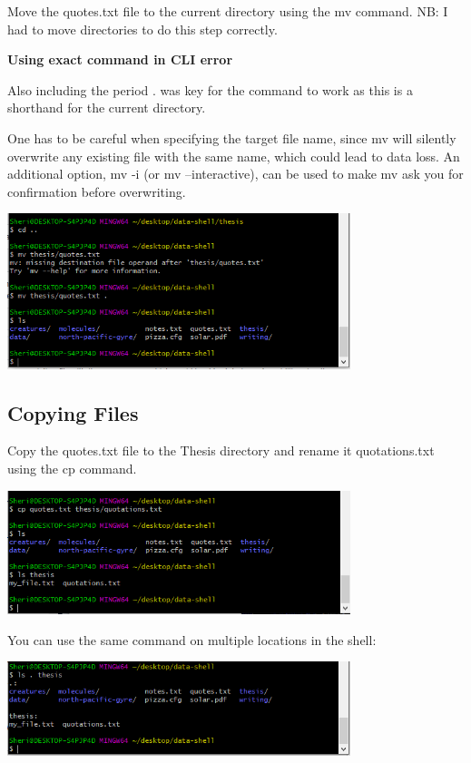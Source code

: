 \documentclass{article}
\begin{document}
Move the quotes.txt file to the current directory using the mv command.
NB: I had to move directories to do this step correctly.

\textbf{Using exact command in CLI error}
\label{ Error: Using exact commands in CLI}

Also including the period . was key for the command to work as this is a shorthand for the current directory.

One has to be careful when specifying the target file name, since mv will silently overwrite any existing file with the same name, which could lead to data loss. An additional option, mv -i (or mv --interactive), can be used to make mv ask you for confirmation before overwriting.

\includegraphics[width=10cm]{Images/GitBash_017.PNG}

\subsection{Copying Files}

Copy the quotes.txt file to the Thesis directory and rename it quotations.txt using the cp command.

\includegraphics[width=10cm]{Images/GitBash_018.PNG}

You can use the same command on multiple locations in the shell:

\includegraphics[width=10cm]{Images/GitBash_020.PNG}
\end{document}
